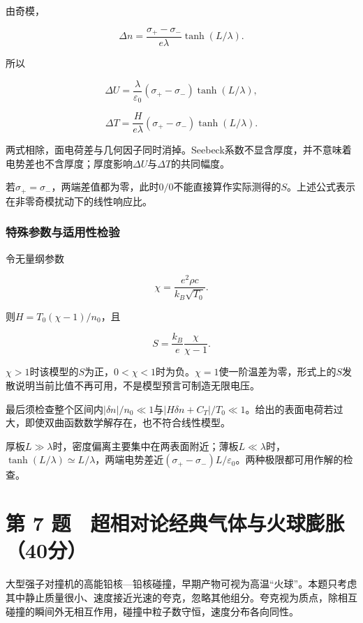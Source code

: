 \documentclass[12pt,a4paper,fontset=fandol]{ctexart}
\begin{document}
由奇模，

\[
\Delta n=
\frac{\sigma_+-\sigma_-}{e\lambda}
\tanh(L/\lambda).
\]

所以

\[
\boxed{\Delta U=
\frac{\lambda}{\varepsilon_0}
(\sigma_+-\sigma_-)\tanh(L/\lambda)},
\]

\[
\boxed{\Delta T=
\frac{H}{e\lambda}
(\sigma_+-\sigma_-)\tanh(L/\lambda)}.
\]

两式相除，面电荷差与几何因子同时消掉。Seebeck系数不显含厚度，并不意味着电势差也不含厚度；厚度影响\(\Delta U\)与\(\Delta T\)的共同幅度。

若\(\sigma_+=\sigma_-\)，两端差值都为零，此时\(0/0\)不能直接算作实际测得的\(S\)。上述公式表示在非零奇模扰动下的线性响应比。

\subsubsection{特殊参数与适用性检验}\label{ux7279ux6b8aux53c2ux6570ux4e0eux9002ux7528ux6027ux68c0ux9a8c}

令无量纲参数

\[
\chi=\frac{e^2\rho c}{k_B\sqrt{T_0}}.
\]

则\(H=T_0(\chi-1)/n_0\)，且

\[
S=\frac{k_B}{e}\frac{\chi}{\chi-1}.
\]

\(\chi>1\)时该模型的\(S\)为正，\(0<\chi<1\)时为负。\(\chi=1\)使一阶温差为零，形式上的\(S\)发散说明当前比值不再可用，不是模型预言可制造无限电压。

最后须检查整个区间内\(|\delta n|/n_0\ll1\)与\(|H\delta n+C_T|/T_0\ll1\)。给出的表面电荷若过大，即使双曲函数数学解存在，也不符合线性模型。

厚板\(L\gg\lambda\)时，密度偏离主要集中在两表面附近；薄板\(L\ll\lambda\)时，\(\tanh(L/\lambda)\simeq L/\lambda\)，两端电势差近\((\sigma_+-\sigma_-)L/\varepsilon_0\)。两种极限都可用作解的检查。

\clearpage

\section{第 7
题　超相对论经典气体与火球膨胀（40分）}\label{ux7b2c-7-ux9898-ux8d85ux76f8ux5bf9ux8bbaux7ecfux5178ux6c14ux4f53ux4e0eux706bux7403ux81a8ux80c040ux5206}

大型强子对撞机的高能铅核---铅核碰撞，早期产物可视为高温``火球''。本题只考虑其中静止质量很小、速度接近光速的夸克，忽略其他组分。夸克视为质点，除相互碰撞的瞬间外无相互作用，碰撞中粒子数守恒，速度分布各向同性。
\end{document}

